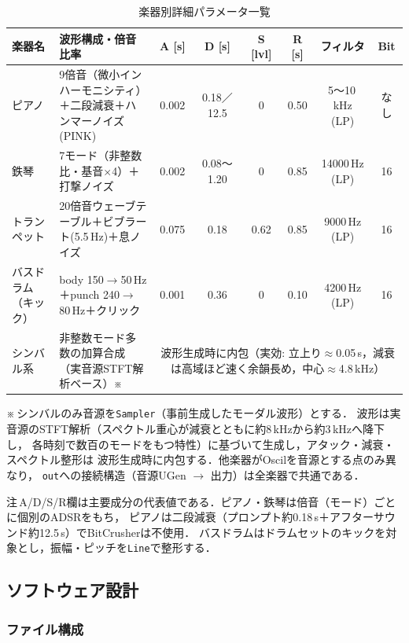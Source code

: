 \begin{table}[h]
  \centering
  \caption{楽器別詳細パラメータ一覧}
  \label{tab:adsr_params}
  \small
  \begin{tabular}{lp{4.5cm}cccccc}
    \hline
    楽器名 & 波形構成・倍音比率 & A {[s]} & D {[s]} & S {[lvl]} & R {[s]} & フィルタ & Bit \\
    \hline
    ピアノ
      & 9倍音（微小インハーモニシティ）＋二段減衰＋ハンマーノイズ(PINK)
      & 0.002 & 0.18／12.5 & 0 & 0.50 & 5〜10\,kHz (LP) & なし \\
    鉄琴
      & 7モード（非整数比・基音$\times$4）＋打撃ノイズ
      & 0.002 & 0.08〜1.20 & 0 & 0.85 & 14000\,Hz (LP) & 16 \\
    トランペット
      & 20倍音ウェーブテーブル＋ビブラート(5.5\,Hz)＋息ノイズ
      & 0.075 & 0.18 & 0.62 & 0.85 & 9000\,Hz (LP) & 16 \\
    バスドラム（キック）
      & body 150$\to$50\,Hz＋punch 240$\to$80\,Hz＋クリック
      & 0.001 & 0.36 & 0 & 0.10 & 4200\,Hz (LP) & 16 \\
    シンバル系
      & 非整数モード多数の加算合成（実音源STFT解析ベース）※
      & \multicolumn{6}{c}{波形生成時に内包（実効: 立上り$\approx$0.05\,s，減衰は高域ほど速く余韻長め，中心$\approx$4.8\,kHz）} \\
    \hline
  \end{tabular}
\end{table}

\noindent
※\,シンバルのみ音源を\texttt{Sampler}（事前生成したモーダル波形）とする．
波形は実音源のSTFT解析（スペクトル重心が減衰とともに約8\,kHzから約3\,kHzへ降下し，
各時刻で数百のモードをもつ特性）に基づいて生成し，アタック・減衰・スペクトル整形は
波形生成時に内包する．他楽器がOscilを音源とする点のみ異なり，
\texttt{out}への接続構造（音源UGen $\rightarrow$ 出力）は全楽器で共通である．

\vspace{0.3em}
\noindent
注\,A/D/S/R欄は主要成分の代表値である．ピアノ・鉄琴は倍音（モード）ごとに個別のADSRをもち，
ピアノは二段減衰（プロンプト約0.18\,s＋アフターサウンド約12.5\,s）でBitCrusherは不使用．
バスドラムはドラムセットのキックを対象とし，振幅・ピッチを\texttt{Line}で整形する．

\subsection{ソフトウェア設計}

\subsubsection{ファイル構成}

